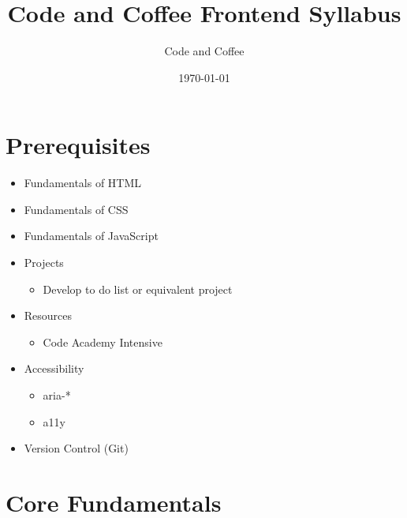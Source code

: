 \documentclass[12pt]{article}
\title{Code and Coffee Frontend Syllabus}
\author{Code and Coffee}
\date{\today}
\begin{document}
\maketitle

\section{Prerequisites}

\begin{itemize}
\item Fundamentals of HTML
\item Fundamentals of CSS
\item Fundamentals of JavaScript
\item Projects
  \begin{itemize}
  \item Develop to do list or equivalent project
  \end{itemize}
\item Resources
  \begin{itemize}
  \item Code Academy Intensive
  \end{itemize}
\item Accessibility
  \begin{itemize}
  \item aria-*
  \item a11y
  \end{itemize}
\item Version Control (Git)
\end{itemize}

\section{Core Fundamentals}
\end{document}
